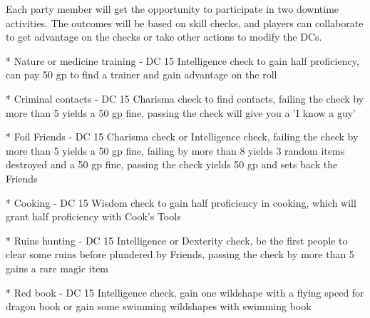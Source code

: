 Each party member will get the opportunity to participate in two downtime activities.
The outcomes will be based on skill checks, and players can collaborate to get advantage on the checks or take other actions to modify the DCs.

* Nature or medicine training - DC 15 Intelligence check to gain half proficiency, can pay 50 gp to find a trainer and gain advantage on the roll

* Criminal contacts - DC 15 Charisma check to find contacts, failing the check by more than 5 yields a 50 gp fine, passing the check will give you a 'I know a guy'

* Foil Friends - DC 15 Charisma check or Intelligence check, failing the check by more than 5 yields a 50 gp fine, failing by more than 8 yields 3 random items destroyed and a 50 gp fine, passing the check yields 50 gp and sets back the Friends

* Cooking - DC 15 Wisdom check to gain half proficiency in cooking, which will grant half proficiency with Cook's Tools

* Ruins hunting - DC 15 Intelligence or Dexterity check, be the first people to clear some ruins before plundered by Friends, passing the check by more than 5 gains a rare magic item

* Red book - DC 15 Intelligence check, gain one wildshape with a flying speed for dragon book or gain some swimming wildshapes with swimming book
